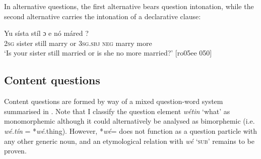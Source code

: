 In alternative questions, the first alternative bears question intonation, while the second alternative carries the intonation of a declarative clause: 


\ea%
    \label{ex:key:584}
\gll
Yu  sísta    stíl    ɔ  e    nó  máred  ?\\
\textsc{2sg}  sister  still  marry  or  \textsc{3sg.sbj}  \textsc{neg}  marry  more\\

\glt ‘Is your sister still married or is she no more married?’ [ro05ee 050]
\z

\subsection{Content questions}\label{sec:7.3.2}

Content questions are formed by way of a mixed question-word system summarised in . Note that I classify the question element \textit{wétin} ‘what’ as monomorphemic although it could alternatively be analysed as bimorphemic (i.e. \textit{wé.tín} = *\textit{wé}.thing). However, *\textit{wé}= does not function as a question particle with any other generic noun, and an etymological relation with \textit{wé} ‘\textsc{sub}’ remains to be proven.


